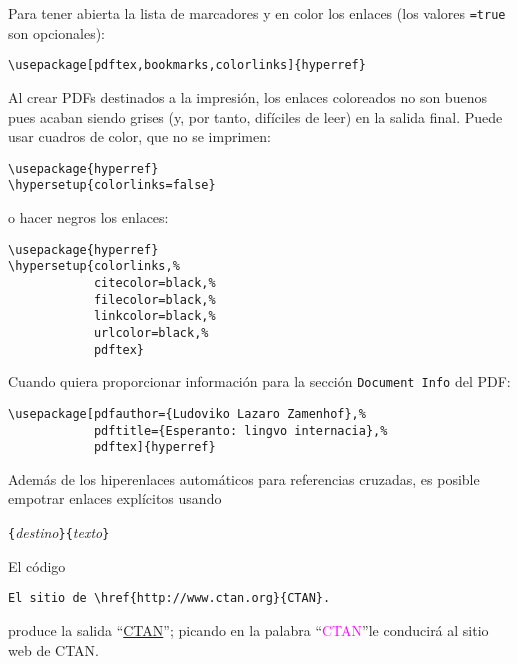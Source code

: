 Para tener abierta la lista de marcadores y en color los enlaces (los valores \texttt{=true} son opcionales):
\begin{code}
\begin{verbatim}
\usepackage[pdftex,bookmarks,colorlinks]{hyperref}
\end{verbatim}
\end{code}

Al crear PDFs destinados a la impresión, los enlaces coloreados no son buenos pues acaban siendo grises (y, por tanto, difíciles de leer) en la salida final.  Puede usar cuadros de color, que no se imprimen:
\begin{code}
\begin{verbatim}
\usepackage{hyperref}
\hypersetup{colorlinks=false}
\end{verbatim}
\end{code}
o hacer negros los enlaces:
\begin{code}
\begin{verbatim}
\usepackage{hyperref}
\hypersetup{colorlinks,%
            citecolor=black,%
            filecolor=black,%
            linkcolor=black,%
            urlcolor=black,%
            pdftex}
\end{verbatim}
\end{code}

Cuando quiera proporcionar información para la sección  \texttt{Document Info} del \filenomo{} PDF:
\begin{code}
\begin{verbatim}
\usepackage[pdfauthor={Ludoviko Lazaro Zamenhof},%
            pdftitle={Esperanto: lingvo internacia},%
            pdftex]{hyperref}
\end{verbatim}
\end{code}

\vspace{\baselineskip}

Además de los hiperenlaces automáticos para referencias cruzadas, es posible empotrar enlaces explícitos usando
\begin{lscommand}
\verb|{|\emph{destino}\verb|}{|\emph{texto}\verb|}|
\end{lscommand}

El código
\begin{code}
\begin{verbatim}
El sitio de \href{http://www.ctan.org}{CTAN}.
\end{verbatim}
\end{code}
produce la salida ``\href{http://www.ctan.org}{CTAN}''; picando en la palabra  ``\textcolor{magenta}{CTAN}''le conducirá al sitio web de CTAN.


